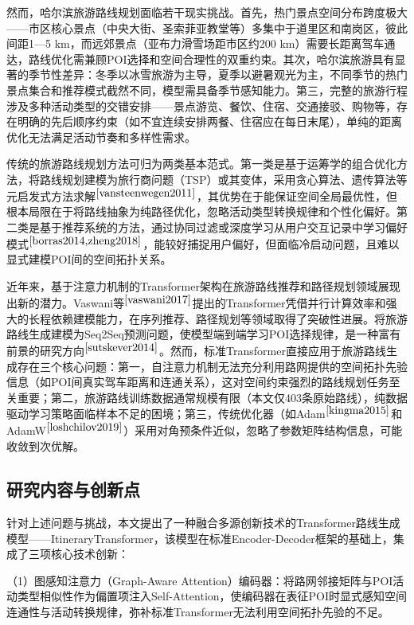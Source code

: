 \documentclass[12pt,a4paper]{ctexart}
\begin{document}
然而，哈尔滨旅游路线规划面临若干现实挑战。首先，热门景点空间分布跨度极大——市区核心景点（中央大街、圣索菲亚教堂等）多集中于道里区和南岗区，彼此间距1—5 km，而远郊景点（亚布力滑雪场距市区约200 km）需要长距离驾车通达，路线优化需兼顾POI选择和空间合理性的双重约束。其次，哈尔滨旅游具有显著的季节性差异：冬季以冰雪旅游为主导，夏季以避暑观光为主，不同季节的热门景点集合和推荐模式截然不同，模型需具备季节感知能力。第三，完整的旅游行程涉及多种活动类型的交错安排——景点游览、餐饮、住宿、交通接驳、购物等，存在明确的先后顺序约束（如不宜连续安排两餐、住宿应在每日末尾），单纯的距离优化无法满足活动节奏和多样性需求。

传统的旅游路线规划方法可归为两类基本范式。第一类是基于运筹学的组合优化方法，将路线规划建模为旅行商问题（TSP）或其变体，采用贪心算法、遗传算法等元启发式方法求解$^{\cite{vansteenwegen2011}}$，其优势在于能保证空间全局最优性，但根本局限在于将路线抽象为纯路径优化，忽略活动类型转换规律和个性化偏好。第二类是基于推荐系统的方法，通过协同过滤或深度学习从用户交互记录中学习偏好模式$^{\cite{borras2014,zheng2018}}$，能较好捕捉用户偏好，但面临冷启动问题，且难以显式建模POI间的空间拓扑关系。

近年来，基于注意力机制的Transformer架构在旅游路线推荐和路径规划领域展现出新的潜力。Vaswani等$^{\cite{vaswani2017}}$提出的Transformer凭借并行计算效率和强大的长程依赖建模能力，在序列推荐、路径规划等领域取得了突破性进展。将旅游路线生成建模为Seq2Seq预测问题，使模型端到端学习POI选择规律，是一种富有前景的研究方向$^{\cite{sutskever2014}}$。然而，标准Transformer直接应用于旅游路线生成存在三个核心问题：第一，自注意力机制无法充分利用路网提供的空间拓扑先验信息（如POI间真实驾车距离和连通关系），这对空间约束强烈的路线规划任务至关重要；第二，旅游路线训练数据通常规模有限（本文仅403条原始路线），纯数据驱动学习策略面临样本不足的困境；第三，传统优化器（如Adam$^{\cite{kingma2015}}$和AdamW$^{\cite{loshchilov2019}}$）采用对角预条件近似，忽略了参数矩阵结构信息，可能收敛到次优解。

\subsection{研究内容与创新点}

针对上述问题与挑战，本文提出了一种融合多源创新技术的Transformer路线生成模型——ItineraryTransformer，该模型在标准Encoder-Decoder框架的基础上，集成了三项核心技术创新：

（1）图感知注意力（Graph-Aware Attention）编码器：将路网邻接矩阵与POI活动类型相似性作为偏置项注入Self-Attention，使编码器在表征POI时显式感知空间连通性与活动转换规律，弥补标准Transformer无法利用空间拓扑先验的不足。
\end{document}
